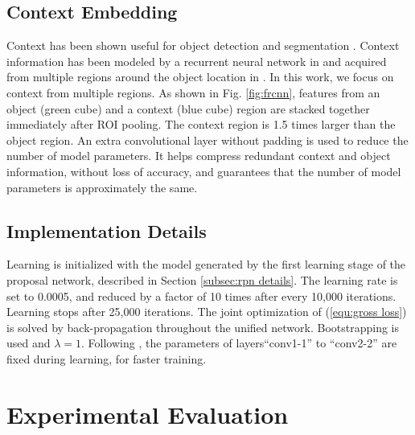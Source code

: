 \documentclass[runningheads]{llncs}
\begin{document}
\subsection{Context Embedding}
\label{subsec:context}

Context has been shown useful for object detection \cite{DBLP:conf/iccv/GidarisK15,DBLP:conf/nips/XiaozhiNIPS15,DBLP:conf/cvpr/BellZBG16} and segmentation \cite{DBLP:conf/cvpr/ZhuUSF15}. Context information has been modeled by a recurrent neural network in \cite{DBLP:conf/cvpr/BellZBG16}
and acquired from multiple regions around the object location in
\cite{DBLP:conf/iccv/GidarisK15,DBLP:conf/nips/XiaozhiNIPS15,DBLP:conf/cvpr/ZhuUSF15}. In this work, we focus on context from multiple
regions.
As shown in Fig. \ref{fig:frcnn}, features from an object (green cube) and
a context (blue cube) region are stacked together immediately after ROI
pooling. The context region is 1.5 times larger than the object region.
An extra convolutional layer without padding is used to reduce
the number of model parameters. It helps compress redundant context and object information, without loss of accuracy, and guarantees that
the number of model parameters is approximately the same.


\subsection{Implementation Details}

Learning is initialized with the model generated by the first learning stage
of the proposal network, described in Section \ref{subsec:rpn details}. The
learning rate is set to 0.0005, and reduced by a factor of 10 times after
every 10,000 iterations. Learning stops after 25,000 iterations. The joint
optimization of (\ref{equ:gross loss}) is solved by back-propagation
throughout the unified network. Bootstrapping is used and $\lambda=1$.
Following \cite{DBLP:conf/iccv/Girshick15}, the parameters of
layers``conv1-1'' to ``conv2-2'' are fixed during learning, for faster
training.




\section{Experimental Evaluation}
\end{document}
